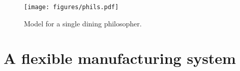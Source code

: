 \begin{figure}
  \centering
  \texttt{[image: figures/phils.pdf]}
  \caption{Model for a single dining philosopher.}
  \label{FIG:dining}
\end{figure}


\begin{comment}

If we wanted to use an advanced symbolic method, we could request this with an
option statement, which must appear before the two \Code{print} statements.
However, this also requires to partition the model.
We could do so by assigning \Code{M} philosophers per level:
\begin{code}
\begin{verbatim}
spn phils(int N, int M) := {
  for (int i in {1..N}) {
    ...
    partition(1+div(i,M):Idle[i]:WaitL[i]:WaitR[i]:HasL[i]:HasR[i]:Fork[i]);
  }
  for (int i in {1..N}) {
    ...
  }
  ...
};
# StateStorage MDD_SATURATION
int N := read_int("number of philosophers");
int M := read_int("number of philosophers per level");
print("Number of reachable states: ", phils(N,M).ns, ".\n");
print("Number of state-to-state transitions: ", phils(N,M).na, ".\n");
\end{verbatim}
\end{code}
Of course, if \Code{N} is not a multiple of \Code{M}, the last
level will have fewer than \Code{M} philosophers.
Also, a partition must define at least two levels, thus
\Code{N} must be strictly greater than \Code{M}.
Having more philosophers per level decreases the number of levels in the
MDD, but increases the size of the local state spaces, hence of the
MDD nodes.

If we had used a method requiring pregeneration of the local state
spaces, we would have to add the statement
\begin{code}
\begin{verbatim}
    inhibit(Fork[1+mod(i,N)]:Rel[i], HasR[1+mod(i,N)]:Rel[i]);
\end{verbatim}
\end{code}
in the second \Code{for} loop, to ensure that these local state spaces
are finite.

\end{comment}

\section{A flexible manufacturing system}


